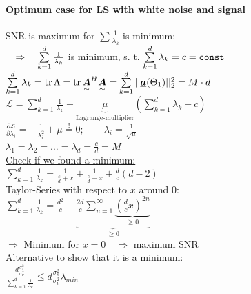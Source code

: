 \begin{doublespace}
\paragraph{Optimum case for LS with white noise and signal}
SNR is maximum for $\sum \frac{1}{\lambda_k}$ is minimum:\\
$\quad\Rightarrow\quad\sum\limits_{k=1}^d\frac{1}{\lambda_k}$ is minimum, s. t. $\sum\limits_{k=1}^d\lambda_k=c=\texttt{const}$\\
$\sum\limits_{k=1}^d\lambda_k=\operatorname{tr}\Lambda=\operatorname{tr}\underset{\sim}{\boldsymbol {A}}^H\underset{\sim}{\boldsymbol {A}}=\sum\limits_{k=1}^d||\underline{\boldsymbol {a}}(\Theta_1)||_2^2=M\cdot d$\\
$\mathcal{L}=\sum\limits_{k=1}^d\frac{1}{\lambda_k}+\underbrace{\mu}_{\text{Lagrange-multiplier}}(\sum\limits_{k=1}^d\lambda_k-c)$\\
$\frac{\partial\mathcal{L}}{\partial\lambda_i}=-\frac{1}{\lambda_i^2}+\mu\stackrel{!}{=}0;\qquad \lambda_i=\frac{1}{\sqrt{\mu}}$\\
$\lambda_1=\lambda_2=\ldots=\lambda_d=\frac{c}{d}=M$\\
\underline{Check if we found a minimum:}\\
$\sum\limits_{k=1}^d\frac{1}{\lambda_k}=\frac{1}{\frac{c}{d}+x}+\frac{1}{\frac{c}{d}-x}+\frac{d}{c}(d-2)$\\
Taylor-Series with respect to $x$ around $0$:\\
$\sum\limits_{k=1}^d\frac{1}{\lambda_k}=\frac{d^2}{c}+\underbrace{\frac{2d}{c}\sum\limits_{n=1}^\infty\underbrace{(\frac{d}{c}x)^{2n}}_{\geq0}}_{\geq 0}$\\
$\Rightarrow$ Minimum for $x=0\quad \Rightarrow$ maximum SNR\\
\underline{Alternative to show that it is a minimum:}\\
$\frac{d\frac{\sigma_s^2}{\sigma_\nu^2}}{\sum\limits_{k=1}^d\frac{1}{\lambda_k}}\leq d\frac{\sigma_s^2}{\sigma_\nu^2}\lambda_{min}$\\ \\


\end{doublespace}
